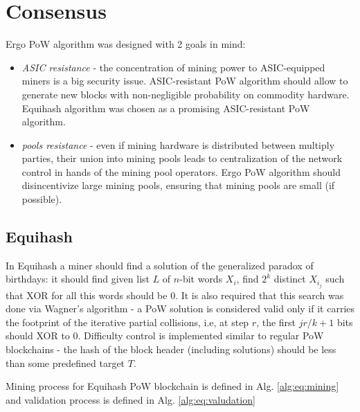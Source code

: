 \section{Consensus}


Ergo PoW algorithm was designed with 2 goals in mind:

\begin{itemize}
    \item{\em ASIC resistance } - the concentration of mining power to ASIC-equipped miners
    is a big security issue.
    ASIC-resistant PoW algorithm should allow to generate new blocks with non-negligible
    probability on commodity hardware.
    Equihash algorithm was chosen as a promising ASIC-resistant PoW algorithm.
    \item{\em pools resistance } - even if mining hardware is distributed between multiply parties,
    their union into mining pools leads to centralization of the network control in hands of the mining pool operators.
    Ergo PoW algorithm should disincentivize large mining pools, ensuring that mining pools are small (if possible).
\end{itemize}

\subsection{Equihash}

In Equihash a miner should find a solution of the generalized paradox of birthdays: it should find
given list $L$ of $n$-bit words ${X_i}$, find $2^k$ distinct ${X_{i_j}}$ such that
XOR for all this words should be 0. It is also required that this search was done via
Wagner's algorithm - a PoW solution is considered valid only if it carries the footprint
of the iterative partial collisions, i.e, at step $r$, the first $jr/k+1$ bits should XOR to 0.
Difficulty control is implemented similar to regular PoW blockchains - the hash of the block header
(including solutions) should be less than some predefined target $T$.

Mining process for Equihash PoW blockchain is defined in Alg. \ref{alg:eq:mining} and validation
process is defined in Alg. \ref{alg:eq:valudation}

